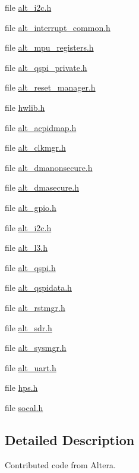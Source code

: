 \begin{DoxyCompactItemize}
\item 
file \mbox{\hyperlink{alt__i2c_8h}{alt\+\_\+i2c.\+h}}
\item 
file \mbox{\hyperlink{alt__interrupt__common_8h}{alt\+\_\+interrupt\+\_\+common.\+h}}
\item 
file \mbox{\hyperlink{alt__mpu__registers_8h}{alt\+\_\+mpu\+\_\+registers.\+h}}
\item 
file \mbox{\hyperlink{alt__qspi__private_8h}{alt\+\_\+qspi\+\_\+private.\+h}}
\item 
file \mbox{\hyperlink{alt__reset__manager_8h}{alt\+\_\+reset\+\_\+manager.\+h}}
\item 
file \mbox{\hyperlink{hwlib_8h}{hwlib.\+h}}
\item 
file \mbox{\hyperlink{alt__acpidmap_8h}{alt\+\_\+acpidmap.\+h}}
\item 
file \mbox{\hyperlink{alt__clkmgr_8h}{alt\+\_\+clkmgr.\+h}}
\item 
file \mbox{\hyperlink{alt__dmanonsecure_8h}{alt\+\_\+dmanonsecure.\+h}}
\item 
file \mbox{\hyperlink{alt__dmasecure_8h}{alt\+\_\+dmasecure.\+h}}
\item 
file \mbox{\hyperlink{alt__gpio_8h}{alt\+\_\+gpio.\+h}}
\item 
file \mbox{\hyperlink{socal_2alt__i2c_8h}{alt\+\_\+i2c.\+h}}
\item 
file \mbox{\hyperlink{alt__l3_8h}{alt\+\_\+l3.\+h}}
\item 
file \mbox{\hyperlink{include_2bsp_2socal_2alt__qspi_8h}{alt\+\_\+qspi.\+h}}
\item 
file \mbox{\hyperlink{alt__qspidata_8h}{alt\+\_\+qspidata.\+h}}
\item 
file \mbox{\hyperlink{alt__rstmgr_8h}{alt\+\_\+rstmgr.\+h}}
\item 
file \mbox{\hyperlink{alt__sdr_8h}{alt\+\_\+sdr.\+h}}
\item 
file \mbox{\hyperlink{alt__sysmgr_8h}{alt\+\_\+sysmgr.\+h}}
\item 
file \mbox{\hyperlink{alt__uart_8h}{alt\+\_\+uart.\+h}}
\item 
file \mbox{\hyperlink{hps_8h}{hps.\+h}}
\item 
file \mbox{\hyperlink{socal_8h}{socal.\+h}}
\end{DoxyCompactItemize}


\subsection{Detailed Description}
Contributed code from Altera. 

